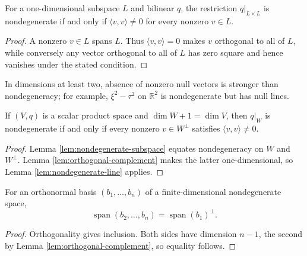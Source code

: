 \begin{lemma}
\label{lem:nondegenerate-line}
\leanok
For a one-dimensional subspace $L$ and bilinear $q$, the restriction $q|_{L\times L}$ is nondegenerate if and only if $\langle v,v\rangle\ne0$ for every nonzero $v\in L$.
\end{lemma}
\begin{proof}
\leanok
\sketch A nonzero $v\in L$ spans $L$. Thus $\langle v,v\rangle=0$ makes $v$ orthogonal to all of $L$, while conversely any vector orthogonal to all of $L$ has zero square and hence vanishes under the stated condition.
\end{proof}

In dimensions at least two, absence of nonzero null vectors is stronger than nondegeneracy; for example, $\xi^2-\tau^2$ on $\mathbb R^2$ is nondegenerate but has null lines.

\begin{lemma}
\label{lem:hyperplane-nondegenerate}
\leanok
{}
If $(V,q)$ is a scalar product space and $\dim W+1=\dim V$, then $q|_W$ is nondegenerate if and only if every nonzero $v\in W^\perp$ satisfies $\langle v,v\rangle\ne0$.
\end{lemma}
\begin{proof}
\leanok
{}
\sketch Lemma \ref{lem:nondegenerate-subspace} equates nondegeneracy on $W$ and $W^\perp$. Lemma \ref{lem:orthogonal-complement} makes the latter one-dimensional, so Lemma \ref{lem:nondegenerate-line} applies.
\end{proof}

\begin{lemma}
\label{lem:orthonormal-tail-spans-orthogonal}
\leanok
{}
For an orthonormal basis $(b_1,\ldots,b_n)$ of a finite-dimensional nondegenerate space,
\[
\operatorname{span}(b_2,\ldots,b_n)=\operatorname{span}(b_1)^\perp.
\]
\end{lemma}
\begin{proof}
\leanok
{}
\sketch Orthogonality gives inclusion. Both sides have dimension $n-1$, the second by Lemma \ref{lem:orthogonal-complement}, so equality follows.
\end{proof}

